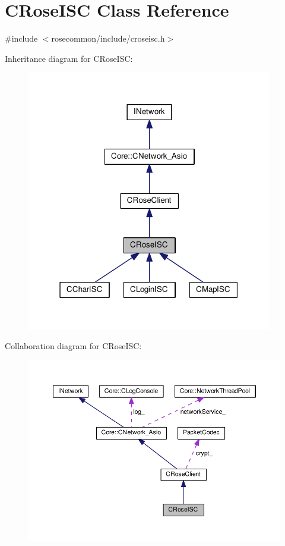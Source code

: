 \hypertarget{classCRoseISC}{}\section{C\+Rose\+I\+SC Class Reference}
\label{classCRoseISC}


{\ttfamily \#include $<$rosecommon/include/croseisc.\+h$>$}



Inheritance diagram for C\+Rose\+I\+SC\+:
\nopagebreak
\begin{figure}[H]
\begin{center}
\leavevmode
\includegraphics[width=304pt]{classCRoseISC__inherit__graph}
\end{center}
\end{figure}


Collaboration diagram for C\+Rose\+I\+SC\+:
\nopagebreak
\begin{figure}[H]
\begin{center}
\leavevmode
\includegraphics[width=350pt]{classCRoseISC__coll__graph}
\end{center}
\end{figure}
